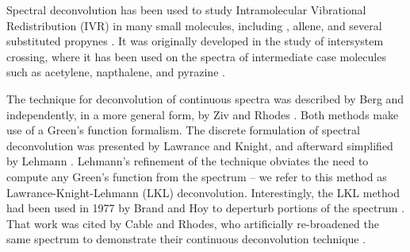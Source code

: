 \documentclass[12pt]{mitthesis}
\begin{document}
Spectral deconvolution has been used to study Intramolecular
Vibrational Redistribution (IVR) in many small molecules, including
, allene, and several substituted propynes \cite{cable80,
  timmermans95, andrews98, hudspeth98}.  It was originally developed
in the study of intersystem crossing, where it has been used on the
spectra of intermediate case molecules such as acetylene, napthalene,
and pyrazine \cite{drabbels94, cable80, lawrance85}.

The technique for deconvolution of continuous spectra was described by
Berg and independently, in a more general form, by Ziv and Rhodes
\cite{berg76, ziv76}.  Both methods make use of a Green's function
formalism.  The discrete formulation of spectral deconvolution was
presented by Lawrance and Knight, and afterward simplified by Lehmann
\cite{lawrance85, lehmann91}.  Lehmann's refinement of the technique
obviates the need to compute any Green's function from the spectrum --
we refer to this method as Lawrance-Knight-Lehmann (LKL)
deconvolution.  Interestingly, the LKL method had been used in 1977 by
Brand and Hoy to deperturb portions of the  spectrum
\cite{brand77}.  That work was cited by Cable and Rhodes, who
artificially re-broadened the same spectrum to demonstrate their
continuous deconvolution technique \cite{cable80}.

\end{document}
